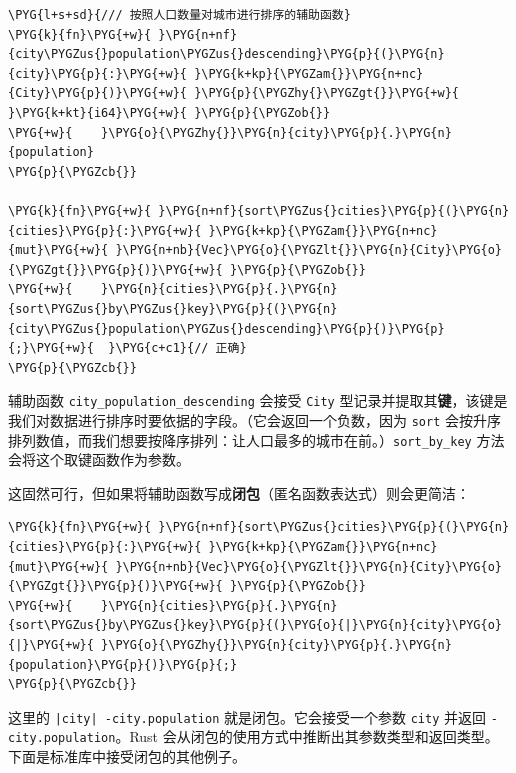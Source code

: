 \begin{Verbatim}[commandchars=\\\{\},breaklines=true,breakanywhere=true,fontsize=\codefont,xleftmargin=17bp]
\PYG{l+s+sd}{/// 按照人口数量对城市进行排序的辅助函数}
\PYG{k}{fn}\PYG{+w}{ }\PYG{n+nf}{city\PYGZus{}population\PYGZus{}descending}\PYG{p}{(}\PYG{n}{city}\PYG{p}{:}\PYG{+w}{ }\PYG{k+kp}{\PYGZam{}}\PYG{n+nc}{City}\PYG{p}{)}\PYG{+w}{ }\PYG{p}{\PYGZhy{}\PYGZgt{}}\PYG{+w}{ }\PYG{k+kt}{i64}\PYG{+w}{ }\PYG{p}{\PYGZob{}}
\PYG{+w}{    }\PYG{o}{\PYGZhy{}}\PYG{n}{city}\PYG{p}{.}\PYG{n}{population}
\PYG{p}{\PYGZcb{}}

\PYG{k}{fn}\PYG{+w}{ }\PYG{n+nf}{sort\PYGZus{}cities}\PYG{p}{(}\PYG{n}{cities}\PYG{p}{:}\PYG{+w}{ }\PYG{k+kp}{\PYGZam{}}\PYG{n+nc}{mut}\PYG{+w}{ }\PYG{n+nb}{Vec}\PYG{o}{\PYGZlt{}}\PYG{n}{City}\PYG{o}{\PYGZgt{}}\PYG{p}{)}\PYG{+w}{ }\PYG{p}{\PYGZob{}}
\PYG{+w}{    }\PYG{n}{cities}\PYG{p}{.}\PYG{n}{sort\PYGZus{}by\PYGZus{}key}\PYG{p}{(}\PYG{n}{city\PYGZus{}population\PYGZus{}descending}\PYG{p}{)}\PYG{p}{;}\PYG{+w}{  }\PYG{c+c1}{// 正确}
\PYG{p}{\PYGZcb{}}
\end{Verbatim}

辅助函数 \texttt{city\_population\_descending} 会接受 \texttt{City} 型记录并提取其\textbf{键}，该键是我们对数据进行排序时要依据的字段。（它会返回一个负数，因为 \texttt{sort} 会按升序排列数值，而我们想要按降序排列：让人口最多的城市在前。）\texttt{sort\_by\_key} 方法会将这个取键函数作为参数。

这固然可行，但如果将辅助函数写成\textbf{闭包}（匿名函数表达式）则会更简洁：

\begin{Verbatim}[commandchars=\\\{\},breaklines=true,breakanywhere=true,fontsize=\codefont,xleftmargin=17bp]
\PYG{k}{fn}\PYG{+w}{ }\PYG{n+nf}{sort\PYGZus{}cities}\PYG{p}{(}\PYG{n}{cities}\PYG{p}{:}\PYG{+w}{ }\PYG{k+kp}{\PYGZam{}}\PYG{n+nc}{mut}\PYG{+w}{ }\PYG{n+nb}{Vec}\PYG{o}{\PYGZlt{}}\PYG{n}{City}\PYG{o}{\PYGZgt{}}\PYG{p}{)}\PYG{+w}{ }\PYG{p}{\PYGZob{}}
\PYG{+w}{    }\PYG{n}{cities}\PYG{p}{.}\PYG{n}{sort\PYGZus{}by\PYGZus{}key}\PYG{p}{(}\PYG{o}{|}\PYG{n}{city}\PYG{o}{|}\PYG{+w}{ }\PYG{o}{\PYGZhy{}}\PYG{n}{city}\PYG{p}{.}\PYG{n}{population}\PYG{p}{)}\PYG{p}{;}
\PYG{p}{\PYGZcb{}}
\end{Verbatim}

这里的 \texttt{|city| -city.population} 就是闭包。它会接受一个参数 \texttt{city} 并返回 \texttt{-city.population}。Rust 会从闭包的使用方式中推断出其参数类型和返回类型。下面是标准库中接受闭包的其他例子。

